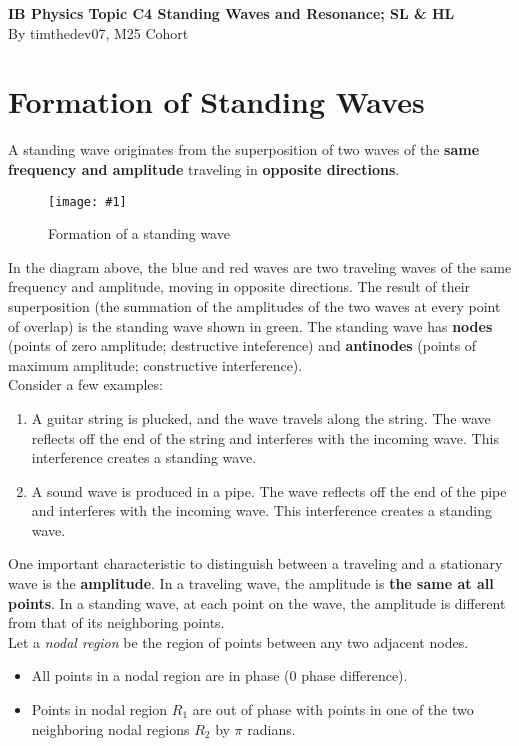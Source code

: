 \documentclass[a4paper,12pt]{article}
\let\oldsection\section
\renewcommand\section{\clearpage\oldsection}
\newcommand{\lb}{\\[8pt]}
\newcommand{\img}[4]{\begin{center}
  \begin{figure}[H]
    \centering
    \texttt{[image: \#1]}
    \caption{#3}
    \label{fig:#4}
  \end{figure}
\end{center}}
\begin{document}
\pagestyle{fancy}


\begin{titlepage}
  \begin{center}

    \vspace*{8cm}
    \textbf{\Large {IB Physics Topic C4 Standing Waves and Resonance; SL \& HL}} \\
    \vspace*{1cm}
    \large{By timthedev07, M25 Cohort}


  \end{center}
\end{titlepage}

\pagebreak
\tableofcontents
\pagebreak

\clearpage
\setcounter{page}{1}

\section{Formation of Standing Waves}

A standing wave originates from the superposition of two waves of the \textbf{same frequency and amplitude} traveling in \textbf{opposite directions}.
\img{standingwaveparts.png}{0.8}{Formation of a standing wave}{standingwaveparts}
In the diagram above, the blue and red waves are two traveling waves of the same frequency and amplitude, moving in opposite directions. The result of their superposition (the summation of the amplitudes of the two waves at every point of overlap) is the standing wave shown in green. The standing wave has \textbf{nodes} (points of zero amplitude; destructive inteference) and \textbf{antinodes} (points of maximum amplitude; constructive interference).\lb
Consider a few examples:
\begin{enumerate}
  \item A guitar string is plucked, and the wave travels along the string. The wave reflects off the end of the string and interferes with the incoming wave. This interference creates a standing wave.
  \item A sound wave is produced in a pipe. The wave reflects off the end of the pipe and interferes with the incoming wave. This interference creates a standing wave.
\end{enumerate}

One important characteristic to distinguish between a traveling and a stationary wave is the \textbf{amplitude}. In a traveling wave, the amplitude is \textbf{the same at all points}. In a standing wave, at each point on the wave, the amplitude is different from that of its neighboring points.\lb
Let a \textit{nodal region} be the region of points between any two adjacent nodes.
\begin{itemize}
  \item All points in a nodal region are in phase (0 phase difference).
  \item Points in nodal region $R_1$ are out of phase with points in one of the two neighboring nodal regions $R_2$ by $\pi$ radians.
\end{itemize}
\end{document}
